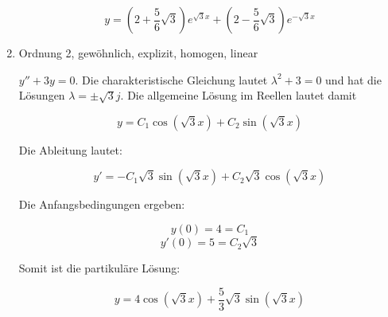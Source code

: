 \begin{enumerate}
$$y = (2 + \frac{5}{6}\sqrt{3}) e^{\sqrt{3}x} + (2 - \frac{5}{6}\sqrt{3}) e^{-\sqrt{3}x}$$

\item Ordnung 2, gewöhnlich, explizit, homogen, linear

$y''+3y = 0$. Die charakteristische Gleichung lautet $\lambda^2+3 = 0$ und hat die Lösungen $\lambda = \pm \sqrt{3} j$. Die allgemeine Lösung im Reellen lautet damit

$$y = C_1 \cos(\sqrt{3}x) + C_2 \sin(\sqrt{3}x)$$

Die Ableitung lautet:

$$y' = - C_1 \sqrt{3} \sin(\sqrt{3}x) + C_2 \sqrt{3} \cos(\sqrt{3}x)$$

Die Anfangsbedingungen ergeben:

$$y(0) = 4 = C_1$$
$$y'(0) = 5 = C_2 \sqrt{3}$$

Somit ist die partikuläre Lösung:

$$y = 4 \cos(\sqrt{3}x) + \frac{5}{3}\sqrt{3} \sin(\sqrt{3}x)$$

\end{enumerate}

